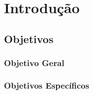 \chapter[Introdução]{Introdução}


\section{Objetivos}
\subsection{Objetivo Geral}


\subsection{Objetivos Específicos}

